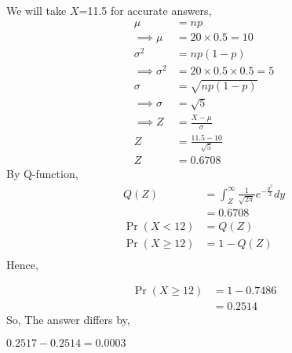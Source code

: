 \documentclass[journal,12pt,twocolumn]{IEEEtran}
\providecommand{\pr}[1]{\ensuremath{\Pr\left(#1\right)}}
\theoremstyle{remark}
\begin{document}
We will take $X$=11.5 for accurate answers,
\begin{align} 
	\mu &= np\\
	\implies
	\mu &= 20 \times 0.5 = 10\\
	\sigma^{2}&= np(1-p)\\
	\implies	
	\sigma^{2}&= 20 \times 0.5 \times 0.5 = 5\\
	\sigma&=\sqrt{np(1-p)}\\
	\implies
	\sigma&= \sqrt{5}\\
	\implies
	Z &= \frac{X-\mu}{\sigma}\\
	Z &= \frac{11.5-10}{\sqrt{5}}\\
	Z &= 0.6708
\end{align}
By Q-function,
\begin{align}
	Q(Z) &= \int_Z^{\infty} \frac{1}{\sqrt{2\pi}}e^{-\frac{y^2}{2}}dy\\
	&= 0.6708\\	
	\pr{X < 12} &= Q(Z)\\
	\pr{X \geq 12} &=1 - Q(Z)\\
\end{align}
Hence,

\begin{align}
	\pr{X \geq 12} &= 1 - 0.7486\\
	&= 0.2514
\end{align}
So, The answer differs by,

\(0.2517 - 0.2514 = 0.0003\)
\end{document}
